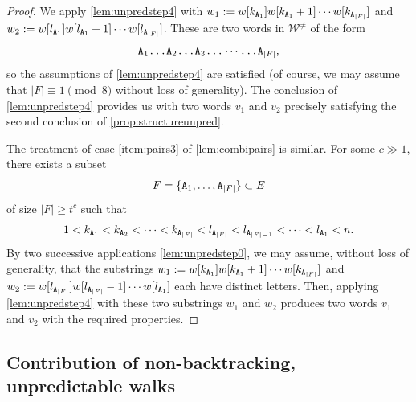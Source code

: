 \documentclass[11pt]{amsart}
\theoremstyle{definition}
\renewcommand{\geq}{\geqslant}
\newcommand{\abs}[1]{\left|#1\right|}
\newcommand{\upletters}[1]{{\normalfont{\texttt{#1}}}}
\newcommand{\makesubscript}[1]{\textsubscript{$#1$}}
\newcommand{\word}{\mathcal{W}}
\begin{document}
\begin{proof}
We apply \cref{lem:unpredstep4} with $w_1 := w[k_{\upletters{A\makesubscript{1}}}]w[k_{\upletters{A\makesubscript{1}}}+1]\cdots w[k_{\upletters{A\makesubscript{\abs{F}}}}]$ and $w_2 := w[l_{\upletters{A\makesubscript{1}}}]w[l_{\upletters{A\makesubscript{1}}}+1]\cdots w[l_{\upletters{A\makesubscript{\abs{F}}}}]$. These are two words in $\word^{\neq}$ of the form 
\begin{equation*}
	\upletters{A\makesubscript{1}\ldots A\makesubscript{2}\ldots A\makesubscript{3}\ldots} \cdots \upletters{\ldots A\makesubscript{\abs{F}}},
\end{equation*}
so the assumptions of \cref{lem:unpredstep4} are satisfied (of course, we may assume that $\abs{F} \equiv 1 \pmod{8}$ without loss of generality). The conclusion of \cref{lem:unpredstep4} provides us with two words $v_1$ and $v_2$ precisely satisfying the second conclusion of \cref{prop:structureunpred}.

The treatment of case \cref{item:pairs3} of \cref{lem:combipairs} is similar. For some $c\gg1$, there exists a subset 
\begin{equation*}
	F = \{\upletters{A\makesubscript{1}},\ldots,\upletters{A\makesubscript{\abs{F}}}\}\subset E
\end{equation*}
of size $\abs{F} \geq t^{c}$ such that 
\begin{equation*}
	1<k_{\upletters{A\makesubscript{1}}}<k_{\upletters{A\makesubscript{2}}}<\cdots <k_{\upletters{A\makesubscript{\abs{F}}}}<l_\upletters{A\makesubscript{\abs{F}}}<l_\upletters{A\makesubscript{\abs{F}\!-\!1}}<\cdots <l_{\upletters{A\makesubscript{1}}}<n.
\end{equation*}
By two successive applications \cref{lem:unpredstep0}, we may assume, without loss of generality, that the substrings $w_1 := w[k_{\upletters{A\makesubscript{1}}}]w[k_{\upletters{A\makesubscript{1}}}+1]\cdots w[k_{\upletters{A\makesubscript{\abs{F}}}}]$ and $w_2 := w[l_{\upletters{A\makesubscript{\abs{F}}}}]w[l_{\upletters{A\makesubscript{\abs{F}}}}-1]\cdots w[l_{\upletters{A\makesubscript{1}}}]$ each have distinct letters. Then, applying \cref{lem:unpredstep4} with these two substrings $w_1$ and $w_2$ produces two words $v_1$ and $v_2$ with the required properties.
\end{proof}



\subsection{Contribution of non-backtracking, unpredictable walks}
\end{document}
